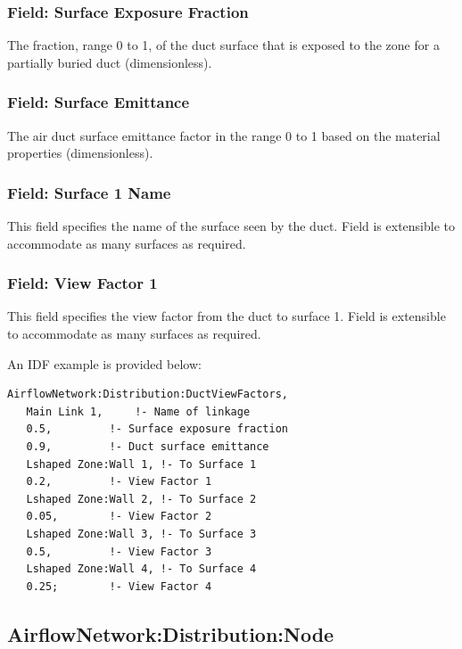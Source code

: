 \subsubsection{Field: Surface Exposure Fraction}\label{field-surface-exposure-fraction}
The fraction, range 0 to 1, of the duct surface that is exposed to the zone for a partially buried duct (dimensionless).

\subsubsection{Field: Surface Emittance}\label{field-surface-emittance}
The air duct surface emittance factor in the range 0 to 1 based on the material properties (dimensionless).

\subsubsection{Field: Surface 1 Name}\label{field-suface-1-name}
This field specifies the name of the surface seen by the duct. Field is extensible to accommodate as many surfaces as required.

\subsubsection{Field: View Factor 1}\label{field-surface-1-view-factor}
This field specifies the view factor from the duct to surface 1. Field is extensible to accommodate as many surfaces as required.

An IDF example is provided below:

\begin{lstlisting}
AirflowNetwork:Distribution:DuctViewFactors,
   Main Link 1,		!- Name of linkage
   0.5,			!- Surface exposure fraction
   0.9,			!- Duct surface emittance
   Lshaped Zone:Wall 1,	!- To Surface 1
   0.2,			!- View Factor 1
   Lshaped Zone:Wall 2,	!- To Surface 2
   0.05,		!- View Factor 2
   Lshaped Zone:Wall 3,	!- To Surface 3
   0.5,			!- View Factor 3
   Lshaped Zone:Wall 4,	!- To Surface 4
   0.25;		!- View Factor 4
\end{lstlisting}

\subsection{AirflowNetwork:Distribution:Node}\label{airflownetworkdistributionnode}

